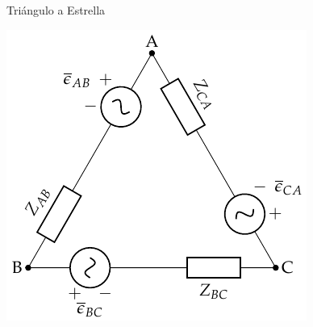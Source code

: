 \documentclass[aspectratio=169, usenames,svgnames,dvipsnames]{beamer}
\begin{document}
\begin{frame}[label={sec:org8f2ca0a}]{Triángulo a Estrella}
\begin{center}
\includegraphics[height=0.9\textheight]{../figs/GeneradorRealTriangulo.pdf}
\end{center}
\end{frame}
\end{document}
